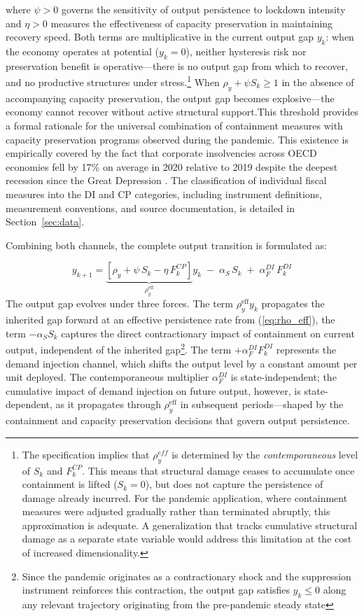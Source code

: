 where $\psi > 0$ governs the sensitivity of output persistence to lockdown intensity and $\eta > 0$ measures the effectiveness of capacity preservation in maintaining recovery speed. Both terms are multiplicative in the current output gap $y_k$: when the economy operates at potential ($y_k = 0$), neither hysteresis risk nor preservation benefit is operative---there is no output gap from which to recover, and no productive structures under stress.\footnote{The specification implies that $\rho_y^{eff}$ is determined by the \textit{contemporaneous} level of $S_k$ and $F_k^{CP}$. This means that structural damage ceases to accumulate once containment is lifted ($S_k = 0$), but does not capture the persistence of damage already incurred. For the pandemic application, where containment measures were adjusted gradually rather than terminated abruptly, this approximation is adequate. A generalization that tracks cumulative structural damage as a separate state variable would address this limitation at the cost of increased dimensionality.} When $\rho_y + \psi S_k \geq 1$ in the absence of accompanying capacity preservation, the output gap becomes explosive---the economy cannot recover without active structural support.This threshold provides a formal rationale for the universal combination of containment measures with capacity preservation programs observed during the pandemic. This existence is empirically covered by the fact that corporate insolvencies across OECD economies fell by 17\% on average in 2020 relative to 2019 despite the deepest recession since the Great Depression \citep{djankov2021, banerjee2021}. The classification of individual fiscal measures into the DI and CP categories, including instrument definitions, measurement conventions, and source documentation, is detailed in Section~\ref{sec:data}.

Combining both channels, the complete output transition is formulated as:

%
\begin{equation}
    y_{k+1} = \underbrace{\left[\rho_y + \psi \, S_k - \eta \, F_k^{CP}\right]}_{\rho_y^{\text{eff}}} y_k
      \;-\; \alpha_S \, S_k
      \;+\; \alpha_F^{DI} \, F_k^{DI}
    \label{eq:output_full}
\end{equation}
%
The output gap evolves under three forces. The term $\rho_y^{\text{eff}} y_k$ propagates the inherited gap forward at an effective persistence rate from (\ref{eq:rho_eff}), the term $-\alpha_S S_k$ captures the direct contractionary impact of containment on current output, independent of the inherited gap\footnote{Since the pandemic originates as a contractionary shock and the suppression instrument reinforces this contraction, the output gap satisfies $y_k \leq 0$ along any relevant trajectory originating from the pre-pandemic steady state}. The term $+\alpha_F^{DI} F_k^{DI}$ represents the demand injection channel, which shifts the output level by a constant amount per unit deployed. The contemporaneous multiplier $\alpha_F^{DI}$ is state-independent; the cumulative impact of demand injection on future output, however, is state-dependent, as it propagates through $\rho_y^{\text{eff}}$ in subsequent periods---shaped by the containment and capacity preservation decisions that govern output persistence.

